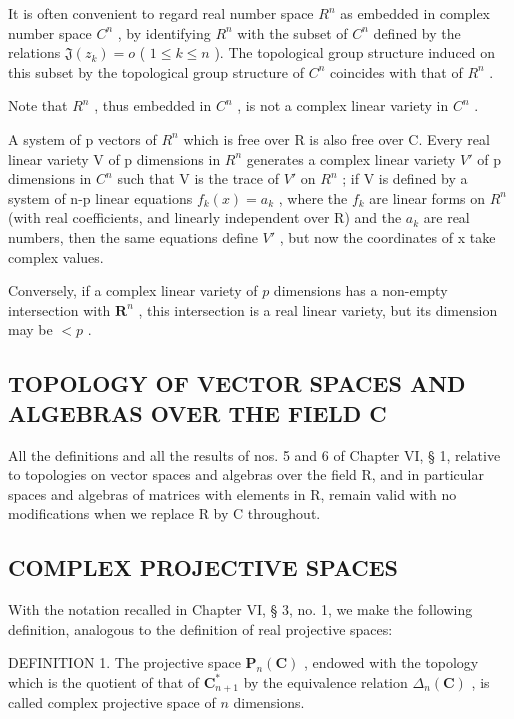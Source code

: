 It is often convenient to regard real number space \(R^{n}\) as embedded in complex number space \(C^{n}\) , by identifying \(R^{n}\) with the subset of \(C^{n}\) defined by the relations \(\mathfrak{J}(z_{k}) = o\) ( \(1 \leqslant k \leqslant n\) ). The topological group structure induced on this subset by the topological group structure of \(C^{n}\) coincides with that of \(R^{n}\) .

Note that \(R^{n}\) , thus embedded in \(C^{n}\) , is not a complex linear variety in \(C^{n}\) .

A system of p vectors of \(R^{n}\) which is free over R is also free over C. Every real linear variety V of p dimensions in \(R^{n}\) generates a complex linear variety \(V'\) of p dimensions in \(C^{n}\) such that V is the trace of \(V'\) on \(R^{n}\) ; if V is defined by a system of n-p linear equations \(f_{k}(x)=a_{k}\) , where the \(f_{k}\) are linear forms on \(R^{n}\) (with real coefficients, and linearly independent over R) and the \(a_{k}\) are real numbers, then the same equations define \(V'\) , but now the coordinates of x take complex values.

Conversely, if a complex linear variety of \(p\) dimensions has a non-empty intersection with \(\mathbf{R}^n\) , this intersection is a real linear variety, but its dimension may be \(< p\) .

\subsection{TOPOLOGY OF VECTOR SPACES AND ALGEBRAS OVER THE FIELD C}

All the definitions and all the results of nos. 5 and 6 of Chapter VI, § 1, relative to topologies on vector spaces and algebras over the field R, and in particular spaces and algebras of matrices with elements in R, remain valid with no modifications when we replace R by C throughout.

\subsection{COMPLEX PROJECTIVE SPACES}

With the notation recalled in Chapter VI, § 3, no. 1, we make the following definition, analogous to the definition of real projective spaces:

DEFINITION 1. The projective space \(\mathbf{P}_{n}(\mathbf{C})\) , endowed with the topology which is the quotient of that of \(\mathbf{C}_{n+1}^{*}\) by the equivalence relation \(\Delta_{n}(\mathbf{C})\) , is called complex projective space of \(n\) dimensions.


